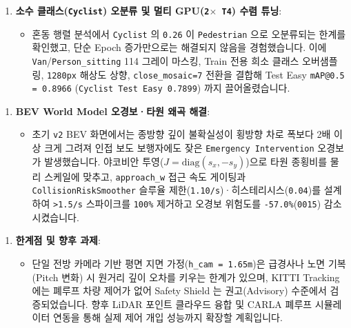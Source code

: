 \documentclass[10.5pt,a4paper]{article}
\begin{document}
\begin{enumerate}[leftmargin=1.8em,itemsep=2pt]
\item \textbf{소수 클래스(\texttt{Cyclist}) 오분류 및 멀티 GPU(\texttt{2$\times$ T4}) 수렴 튜닝}:
\begin{itemize}[leftmargin=1.5em,itemsep=2pt]
\item 혼동 행렬 분석에서 \texttt{Cyclist} 의 \texttt{0.\allowbreak{}26} 이 \texttt{Pedestrian} 으로 오분류되는 한계를 확인했고, 단순 Epoch 증가만으로는 해결되지 않음을 경험했습니다. 이에 \texttt{Van}/\texttt{Person\_\allowbreak{}sitting} 114 그레이 마스킹, Train 전용 희소 클래스 오버샘플링, \texttt{1280px} 해상도 상향, \texttt{close\_\allowbreak{}mosaic=7} 전환을 결합해 Test Easy \texttt{mAP@0.\allowbreak{}5 = 0.\allowbreak{}8966} (\texttt{Cyclist Test Easy 0.\allowbreak{}7899}) 까지 끌어올렸습니다.
\end{itemize}
\end{enumerate}

\begin{enumerate}[leftmargin=1.8em,itemsep=2pt]
\item \textbf{BEV World Model 오경보·타원 왜곡 해결}:
\begin{itemize}[leftmargin=1.5em,itemsep=2pt]
\item 초기 \texttt{v2} BEV 화면에서는 종방향 깊이 불확실성이 횡방향 차로 폭보다 2배 이상 크게 그려져 인접 보도 보행자에도 잦은 \texttt{Emergency Intervention} 오경보가 발생했습니다. 야코비안 투영($J=\text{diag}(s_x,-s_y)$)으로 타원 종횡비를 물리 스케일에 맞추고, \texttt{approach\_\allowbreak{}w} 접근 속도 게이팅과 \texttt{CollisionRiskSmoother} 슬루율 제한(\texttt{1.\allowbreak{}10/\allowbreak{}s})·히스테리시스(\texttt{0.\allowbreak{}04})를 설계하여 \texttt{>1.\allowbreak{}5/\allowbreak{}s} 스파이크를 \texttt{100\%} 제거하고 오경보 위험도를 \texttt{-\allowbreak{}57.\allowbreak{}0\%}(\texttt{0015}) 감소시켰습니다.
\end{itemize}
\end{enumerate}

\begin{enumerate}[leftmargin=1.8em,itemsep=2pt]
\item \textbf{한계점 및 향후 과제}:
\begin{itemize}[leftmargin=1.5em,itemsep=2pt]
\item 단일 전방 카메라 기반 평면 지면 가정(\texttt{h\_\allowbreak{}cam = 1.\allowbreak{}65m})은 급경사나 노면 기복(Pitch 변화) 시 원거리 깊이 오차를 키우는 한계가 있으며, KITTI Tracking에는 폐루프 차량 제어가 없어 Safety Shield 는 권고(Advisory) 수준에서 검증되었습니다. 향후 LiDAR 포인트 클라우드 융합 및 CARLA 폐루프 시뮬레이터 연동을 통해 실제 제어 개입 성능까지 확장할 계획입니다.
\end{itemize}
\end{enumerate}
\newpage
\end{document}
